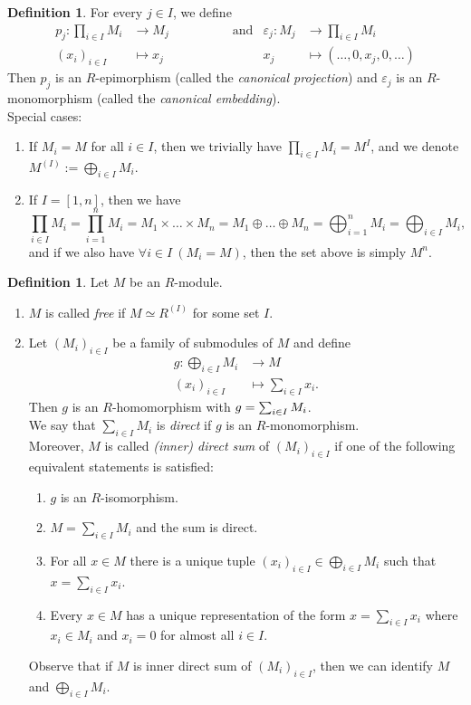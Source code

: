 \documentclass[12pt,a4paper]{report}
\theoremstyle{definition}
\newtheorem{defn}[theorem]{Definition}
\theoremstyle{num.custom-title}
\let\o\relax %
\DeclareMathOperator{\o}{\mathsf{o}}
\let\Im\relax %
\DeclareMathOperator{\Im}{Im}
\renewcommand{\epsilon}{\varepsilon}
\begin{document}
\begin{defn}
For every $j \in I$, we define 
\begin{align*}
p_j \colon \prod_{i \in I} M_i &\to M_j  \quad \quad \quad \quad \quad \text{and}  &\epsilon_j \colon M_j &\to \prod_{i \in I} M_i \\
(x_i)_{i \in I} &\mapsto x_j    &x_j &\mapsto (\ldots,0,x_j,0,\ldots)
\end{align*}
Then $p_j$ is an $R$-epimorphism (called the \emph{canonical projection}) and $\epsilon_j$ is an $R$-monomorphism (called the \emph{canonical embedding}).\\
Special cases:
\begin{enumerate}
\item If $M_i = M$ for all $i \in I$, then we trivially have $\prod_{i \in I} M_i = M^I$, and we denote $M^{(I)} := \bigoplus_{i \in I} M_i$.
\item If $I=[1,n]$, then we have
\[
\prod_{i \in I} M_i = \prod_{i=1}^n M_i = M_1 \times \ldots \times M_n = M_1 \oplus \ldots \oplus M_n = \bigoplus_{i=1}^n M_i = \bigoplus_{i \in I} M_i,
\]
and if we also have $\forall i \in I \ (M_i=M)$, then the set above is simply $M^n$.
\end{enumerate}
\end{defn}

\begin{defn}\label{def-free_m-sum_dir}
Let $M$ be an $R$-module.
\begin{enumerate}
\item $M$ is called \emph{free} if $M \simeq R^{(I)}$ for some set $I$.
\item Let $(M_i)_{i \in I}$ be a family of submodules of $M$ and define
\begin{align*}
g \colon \bigoplus_{i \in I} M_i &\to M \\
(x_i)_{i \in I} &\mapsto \sum_{i \in I} x_i.
\end{align*}
Then $g$ is an $R$-homomorphism with $\Im g = \sum_{i \in I} M_i$.\\
We say that $\sum_{i \in I} M_i$ is \emph{direct} if $g$ is an $R$-monomorphism.\\
Moreover, $M$ is called \emph{(inner) direct sum} of $(M_i)_{i \in I}$ if one of the following equivalent statements is satisfied:
\begin{enumerate}
\item $g$ is an $R$-isomorphism.
\item $M=\sum_{i \in I} M_i$ and the sum is direct.
\item For all $x \in M$ there is a unique tuple $(x_i)_{i \in I} \in \bigoplus_{i \in I} M_i$ such that $x = \sum_{i \in I} x_i$.
\item Every $x \in M$ has a unique representation of the form $x = \sum_{i \in I} x_i$ where $x_i \in M_i$ and $x_i = 0$ for almost all $i \in I$.
\end{enumerate}
Observe that if $M$ is inner direct sum of $(M_i)_{i \in I}$, then we can identify $M$ and $\bigoplus_{i \in I} M_i$.
\end{enumerate}
\end{defn}
\end{document}
